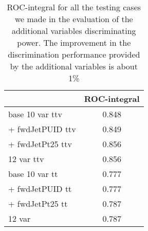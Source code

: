 \begin{table}
\centering
\begin{tabular}{lc}
  \hline
                 &  ROC-integral \\\hline               
base 10 var ttv  & 0.848\\
+ fwdJetPUID ttv & 0.849\\
+ fwdJetPt25 ttv & 0.856\\
12 var ttv       & 0.856\\\hline\hline
base 10 var tt   & 0.777\\
+ fwdJetPUID tt  & 0.777\\
+ fwdJetPt25 tt  & 0.787\\
12 var           & 0.787\\\hline

\end{tabular}
\caption[ROC-integral for all the testing cases.]{ROC-integral for all the testing cases we made in the evaluation of the additional variables discriminating power. The improvement in the discrimination performance provided by the additional variables is about 1\% }\label{tab:add_var_improvement}
\end{table}





